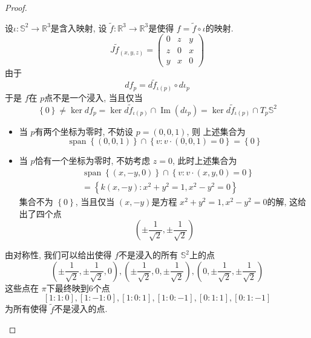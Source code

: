 \documentclass[../main.tex]{subfiles}
\begin{document}
\begin{proof}
\begin{enumerate}
   设\(  \iota : \mathbb{S}^{2}\to \mathbb{R} ^{3}  \)是含入映射, 设 \(  \tilde{f}:\mathbb{R} ^{3}\to \mathbb{R} ^{3}  \)是使得 \(  f= \tilde{f}\circ \iota   \)的映射.    \[
    J \tilde{f}_{\left( x,y,z \right) }= \begin{pmatrix} 
          0&z&y\\ 
           z&0&x\\ 
            y&x&0
    \end{pmatrix} 
   \]由于 \[
    d f_{p}=  d \tilde{f}_{\iota \left( p \right) } \circ d \iota _{p}
   \]于是 \(  f  \)在 \(  p  \)点不是一个浸入, 当且仅当 \[
   \left\{ 0 \right\}\neq  \operatorname{ker} df_{p}= \operatorname{ker} d \tilde{f}_{\iota \left( p \right) }\cap  \operatorname{Im}\left( d \iota _{p} \right) = \operatorname{ker}d \tilde{f}_{\iota \left( p \right) }\cap T_{p}\mathbb{S}^{2}
   \]  \begin{itemize}
    \item 当 \(  p  \)有两个坐标为零时, 不妨设 \(  p= \left( 0,0,1 \right)   \), 则    上述集合为 \[
    \operatorname{span}\left\{ \left( 0,0,1 \right)  \right\}\cap \left\{ v: v\cdot \left( 0,0,1 \right)= 0  \right\}= \left\{ 0 \right\}
    \]
    \item 当 \(  p  \)恰有一个坐标为零时,  不妨考虑 \(  z= 0  \), 此时上述集合为 \[
    \begin{aligned}
   & \operatorname{span}\left\{ \left( x,-y,0 \right)  \right\}\cap \left\{ v: v\cdot \left( x,y,0 \right)= 0  \right\}\\ 
    &= \left\{ k\left( x,-y \right): x^{2}+ y^{2}= 1, x^{2}-y^{2}= 0  \right\} 
    \end{aligned}
    \] 集合不为 \(  \left\{ 0 \right\}  \), 当且仅当 \(  \left( x,-y \right)   \)是方程 \(  x^{2}+ y^{2}= 1, x^{2}-y^{2}= 0  \)的解, 这给出了四个点 \[
    \left( \pm \frac{1 }{\sqrt{2} },\pm \frac{1 }{\sqrt{2} }   \right) 
    \] 
   \end{itemize}
   由对称性, 我们可以给出使得 \(  f  \)不是浸入的所有 \(  \mathbb{S}^{2}  \)上的点 \[
   (\pm \frac{1}{\sqrt{2}}, \pm \frac{1}{\sqrt{2}}, 0), (\pm \frac{1}{\sqrt{2}}, 0, \pm \frac{1}{\sqrt{2}}), (0, \pm \frac{1}{\sqrt{2}}, \pm \frac{1}{\sqrt{2}})
   \]  这些点在 \(   \pi   \)下最终映到6个点 \[
   [1:1:0], [1:-1:0], [1:0:1], [1:0:-1], [0:1:1], [0:1:-1]
   \] 为所有使得 \(  \tilde{f}  \)不是浸入的点.
   

\end{enumerate}
\end{proof}
\end{document}
